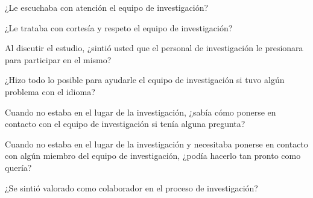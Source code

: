 \documentclass[spanish,pagemark,stamp,oneside,print_questionnaire_id]{sdapsclassic}
\begin{document}
\begin{questionnaire}
\begin{Form}
                        \begin{optionquestion}[singlechoice,cols=1]{¿Le escuchaba con atención el equipo de investigación?}\end{optionquestion}
                        \begin{optionquestion}[singlechoice,cols=1]{¿Le trataba con cortesía y respeto el equipo de investigación?}\end{optionquestion}
                        \begin{optionquestion}[singlechoice,cols=1]{Al discutir el estudio, ¿sintió usted que el personal de investigación le presionara para participar en el mismo?}\end{optionquestion}
                        \begin{optionquestion}[singlechoice,cols=1]{¿Hizo todo lo posible para ayudarle el equipo de investigación si tuvo algún problema con el idioma?}\end{optionquestion}
                        \begin{optionquestion}[singlechoice,cols=1]{Cuando no estaba en el lugar de la investigación, ¿sabía cómo ponerse en contacto con el equipo de investigación si tenía alguna pregunta?}\end{optionquestion}
                        \begin{optionquestion}[singlechoice,cols=1]{Cuando no estaba en el lugar de la investigación y necesitaba ponerse en contacto con algún miembro del equipo de investigación, ¿podía hacerlo tan pronto como quería?}\end{optionquestion}
                        \begin{optionquestion}[singlechoice,cols=1]{¿Se sintió valorado como colaborador en el proceso de investigación?}\end{optionquestion}

\end{Form}
\end{questionnaire}
\end{document}

